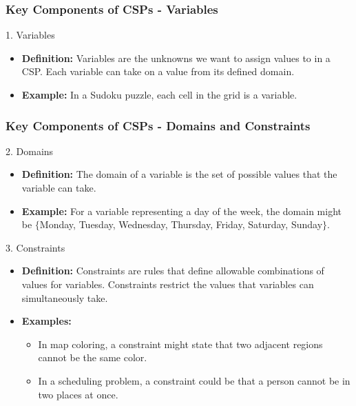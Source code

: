 \documentclass[aspectratio=169]{beamer}
\begin{document}
\begin{frame}[fragile]
  \frametitle{Key Components of CSPs - Variables}
  \begin{block}{1. Variables}
    \begin{itemize}
      \item \textbf{Definition:} Variables are the unknowns we want to assign values to in a CSP. Each variable can take on a value from its defined domain.
      \item \textbf{Example:} In a Sudoku puzzle, each cell in the grid is a variable.
    \end{itemize}
  \end{block}
\end{frame}

\begin{frame}[fragile]
  \frametitle{Key Components of CSPs - Domains and Constraints}
  \begin{block}{2. Domains}
    \begin{itemize}
      \item \textbf{Definition:} The domain of a variable is the set of possible values that the variable can take.
      \item \textbf{Example:} For a variable representing a day of the week, the domain might be $\{$Monday, Tuesday, Wednesday, Thursday, Friday, Saturday, Sunday$\}$.
    \end{itemize}
  \end{block}
  
  \begin{block}{3. Constraints}
    \begin{itemize}
      \item \textbf{Definition:} Constraints are rules that define allowable combinations of values for variables. Constraints restrict the values that variables can simultaneously take.
      \item \textbf{Examples:}
        \begin{itemize}
          \item In map coloring, a constraint might state that two adjacent regions cannot be the same color.
          \item In a scheduling problem, a constraint could be that a person cannot be in two places at once.
        \end{itemize}
    \end{itemize}
  \end{block}
\end{frame}
\end{document}
